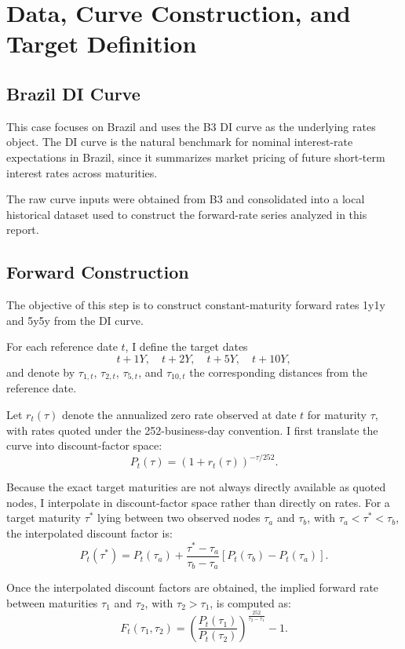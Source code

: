 \documentclass[11pt]{article}
\begin{document}
	
	\section{Data, Curve Construction, and Target Definition}
	\label{sec:curve_target}
	

	\subsection{Brazil DI Curve}
	\label{subsec:brazil_di_curve}
	This case focuses on Brazil and uses the B3 DI curve as the underlying rates object. The DI curve is the natural benchmark for nominal interest-rate expectations in Brazil, since it summarizes market pricing of future short-term interest rates across maturities.
	
	The raw curve inputs were obtained from B3 and consolidated into a local historical dataset used to construct the forward-rate series analyzed in this report.
\subsection{Forward Construction}

The objective of this step is to construct constant-maturity forward rates 1y1y and 5y5y from the
DI curve.

For each reference date $t$, I define the target dates
\[
t+1Y,\quad t+2Y,\quad t+5Y,\quad t+10Y,
\]
and denote by $\tau_{1,t}$, $\tau_{2,t}$, $\tau_{5,t}$, and $\tau_{10,t}$ the corresponding distances
from the reference date.

Let $r_t(\tau)$ denote the annualized zero rate observed at date $t$ for maturity $\tau$, with
rates quoted under the 252-business-day convention. I first translate the curve into discount-factor
space:
\[
P_t(\tau) = (1 + r_t(\tau))^{-\tau/252}.
\]

Because the exact target maturities are not always directly available as quoted nodes, I interpolate
in discount-factor space rather than directly on rates. For a target maturity $\tau^*$ lying between
two observed nodes $\tau_a$ and $\tau_b$, with $\tau_a < \tau^* < \tau_b$, the interpolated
discount factor is:
\[
P_t(\tau^*) = P_t(\tau_a) + \frac{\tau^* - \tau_a}{\tau_b - \tau_a}
\left[ P_t(\tau_b) - P_t(\tau_a) \right].
\]

Once the interpolated discount factors are obtained, the implied forward rate between maturities
$\tau_1$ and $\tau_2$, with $\tau_2 > \tau_1$, is computed as:
\[
F_t(\tau_1, \tau_2) =
\left(
\frac{P_t(\tau_1)}{P_t(\tau_2)}
\right)^{\frac{252}{\tau_2-\tau_1}} - 1.
\]
\end{document}
